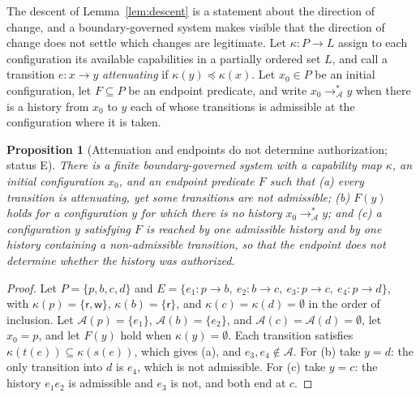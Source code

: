 \documentclass[11pt]{article}
\newtheorem{proposition}[theorem]{Proposition}
\theoremstyle{definition}
\theoremstyle{remark}
\newcommand{\Et}{status E}
\begin{document}
The descent of Lemma~\ref{lem:descent} is a statement about the direction of change, and a boundary-governed system makes visible that the direction of change does not settle which changes are legitimate. Let $\kappa:P\to L$ assign to each configuration its available capabilities in a partially ordered set $L$, and call a transition $e:x\to y$ \emph{attenuating} if $\kappa(y)\preceq\kappa(x)$. Let $x_0\in P$ be an initial configuration, let $F\subseteq P$ be an endpoint predicate, and write $x_0\to_{\mathcal A}^{*}y$ when there is a history from $x_0$ to $y$ each of whose transitions is admissible at the configuration where it is taken.

\begin{proposition}[Attenuation and endpoints do not determine authorization; \Et]\label{prop:attenuation}
There is a finite boundary-governed system with a capability map $\kappa$, an initial configuration $x_0$, and an endpoint predicate $F$ such that (a) every transition is attenuating, yet some transitions are not admissible; (b) $F(y)$ holds for a configuration $y$ for which there is no history $x_0\to_{\mathcal A}^{*}y$; and (c) a configuration $y$ satisfying $F$ is reached by one admissible history and by one history containing a non-admissible transition, so that the endpoint does not determine whether the history was authorized.
\end{proposition}

\begin{proof}
Let $P=\{p,b,c,d\}$ and $E=\{e_1:p\to b,\ e_2:b\to c,\ e_3:p\to c,\ e_4:p\to d\}$, with $\kappa(p)=\{\mathsf r,\mathsf w\}$, $\kappa(b)=\{\mathsf r\}$, and $\kappa(c)=\kappa(d)=\emptyset$ in the order of inclusion. Let $\mathcal A(p)=\{e_1\}$, $\mathcal A(b)=\{e_2\}$, and $\mathcal A(c)=\mathcal A(d)=\emptyset$, let $x_0=p$, and let $F(y)$ hold when $\kappa(y)=\emptyset$. Each transition satisfies $\kappa(t(e))\subseteq\kappa(s(e))$, which gives (a), and $e_3,e_4\notin\mathcal A$. For (b) take $y=d$: the only transition into $d$ is $e_4$, which is not admissible. For (c) take $y=c$: the history $e_1e_2$ is admissible and $e_3$ is not, and both end at $c$.
\end{proof}
\end{document}
